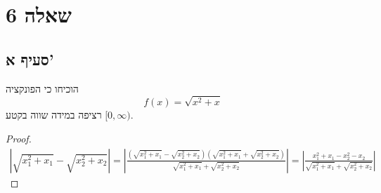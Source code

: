 \section{שאלה 6}
\subsection{סעיף א'}
הוכיחו כי הפונקציה
\[
	f(x) = \sqrt{x^2 + x}
\]
רציפה במידה שווה בקטע $[0, \infty)$. %
\begin{proof}
	\begin{align*}
		\left\lvert \sqrt{x_1^2 + x_1} - \sqrt{x_2^2 + x_2} \right\rvert
		= \left\lvert \frac{\left( \sqrt{x_1^2 + x_1} - \sqrt{x_2^2 + x_2} \right)\left( \sqrt{x_1^2 + x_1} + \sqrt{x_2^2 + x_2} \right)}
			{\sqrt{x_1^2 + x_1} + \sqrt{x_2^2 + x_2}} \right\rvert
		= \left\lvert \frac{ x_1^2 + x_1 - x_2^2 - x_2 }
			{\sqrt{x_1^2 + x_1} + \sqrt{x_2^2 + x_2}} \right\rvert
	\end{align*}
\end{proof}
